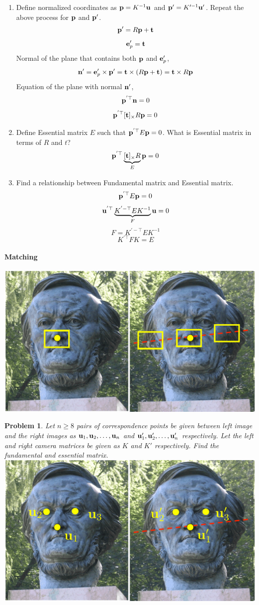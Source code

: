 \documentclass[times,singlecolumn]{article}
\newtheorem{prob}{Problem}
\begin{document}
\begin{enumerate}
   \item Define normalized coordinates as $\mathbf{p} = K^{-1}\mathbf{u}$ and $\mathbf{p}' =
     K'^{-1} \mathbf{u}'$.  Repeat the above process for $\mathbf{p}$ and $\mathbf{p}'$.
     \\
     \[  \mathbf{p}' =  R \mathbf{p} + \mathbf{t} \]
     \[  \mathbf{e}'_p =  \mathbf{t} \]
     Normal of the plane that contains both $\mathbf{p}$ and $\mathbf{e}'_p$,
     \[ \mathbf{n}' = \mathbf{e}'_p \times \mathbf{p}'  = \mathbf{t} \times (R \mathbf{p} + \mathbf{t}) = \mathbf{t}
       \times R\mathbf{p} \]
     Equation of the plane with normal $\mathbf{n}'$,
     \[ \mathbf{p}^{'\top} \mathbf{n}  = 0\]
     \[ \mathbf{p}^{'\top} [ \mathbf{t}]_{\times} R   \mathbf{p}  = 0\]

  \item Define Essential matrix $E$ such that $\mathbf{p}^{'\top} E\mathbf{p} = 0$. What is
    Essential matrix in terms of $ R$ and $t$?
    \[ \mathbf{p}^{'\top} \underbrace{[ \mathbf{t}]_{\times} R}_{E}   \mathbf{p}  = 0\]

  \item Find a relationship between Fundamental matrix and Essential matrix.
    \[ \mathbf{p}^{'\top} E \mathbf{p}  = 0 \]
    \[ \mathbf{u}^{'\top} \underbrace{K^{'-\top} E K^{-1}}_{F} \mathbf{u}  = 0 \]
    \[ F = K^{'-\top} E K^{-1} \]
    \[ K^{'\top} F K = E \]
\end{enumerate}

\paragraph{Matching}
\includegraphics[width=0.5\linewidth]{media/stereo-images-matching.pdf}
\vspace{10em}

\begin{prob}
  Let $n \ge 8$ pairs of correspondence points be given between left image and
  the right images as $\mathbf{u}_1, \mathbf{u}_2, \dots, \mathbf{u}_n$ and $\mathbf{u}'_1, \mathbf{u}'_2,
  \dots, \mathbf{u}'_n$ respectively. Let the left and right camera matrices be given
  as $K$ and $K'$ respectively. Find the fundamental and essential matrix.
  \\
  \includegraphics[width=0.5\linewidth]{media/stereo-images-correspond.pdf}
\end{prob}
\end{document}
